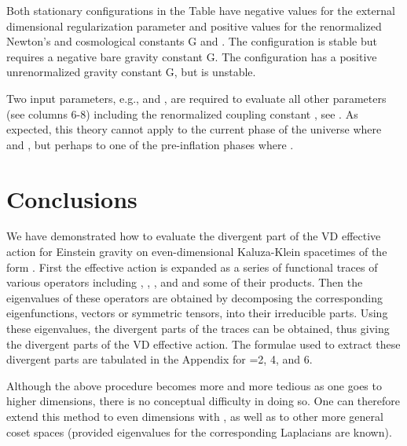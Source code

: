 \documentclass[a4paper,aps,preprint,groupedaddress,showpacs]{revtex4}
\begin{document}
Both stationary configurations in the Table have negative values for the 
external dimensional regularization parameter 
\coordHE{} and positive values for the renormalized Newton's and cosmological 
constants G\coordHE{} and \coordHE{}. 
The \coordHE{} configuration is stable but requires a negative bare 
gravity constant G. The \coordHE{} configuration has
a positive unrenormalized gravity constant G, but is unstable.


Two input parameters, e.g., \coordHE{} and \coordHE{}, are required to evaluate all 
other parameters (see columns 6-8) including the renormalized \coordHE{} 
coupling constant \coordHE{}, see \cite{CW}. As expected, this theory 
cannot apply to the current phase of the universe where \coordHE{}
and \coordHE{}, but perhaps to one of the 
pre-inflation phases where \coordHE{}.



\section{Conclusions}

We have demonstrated how to evaluate the divergent part of the VD
effective action for Einstein gravity on even-dimensional Kaluza-Klein spacetimes 
of the form \coordHE{}.
First the effective action is expanded as a series of functional
traces of various operators including \coordHE{}, \coordHE{}, 
\coordHE{}, and \coordHE{} and some of their products. Then the eigenvalues of these operators
are obtained by decomposing the corresponding eigenfunctions, 
vectors or symmetric tensors, into their irreducible parts. 
Using these eigenvalues, the divergent parts of the traces can
be obtained, thus giving the divergent parts 
of the VD effective action. 
The formulae used to extract these divergent
parts are tabulated in the Appendix for \coordHE{}=2, 4, and 6.

Although the above procedure becomes more and more tedious as
one goes to higher dimensions, there is no conceptual 
difficulty in doing so. One can therefore extend this method
to even dimensions with \coordHE{}, as well as to other more general coset 
spaces (provided eigenvalues
for the corresponding Laplacians are known).
\end{document}
